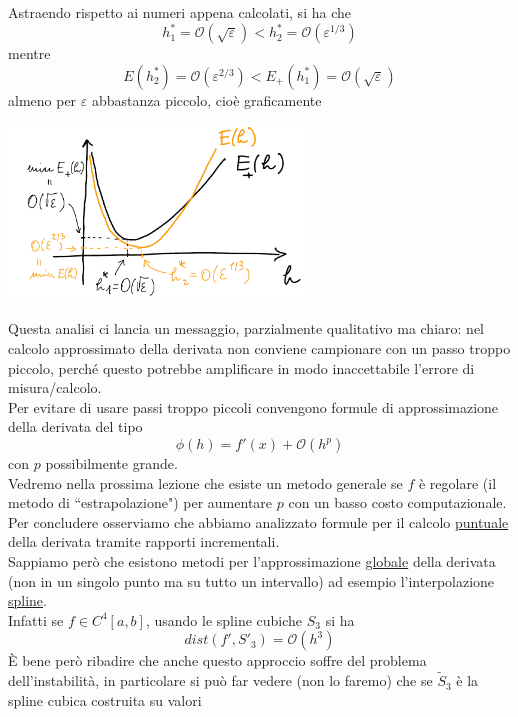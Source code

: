 Astraendo rispetto ai numeri
appena calcolati, si ha che
\[
h_1^* = \mathcal{O}(\sqrt{\varepsilon}) < h_2^* = \mathcal{O}(\varepsilon^{1/3})
\]
mentre
\[
E(h_2^*) = \mathcal{O}(\varepsilon^{2/3}) < E_+(h_1^*) = \mathcal{O}(\sqrt{\varepsilon})
\]
almeno per $\varepsilon$ abbastanza piccolo, cioè graficamente
\begin{center}
    \includegraphics[width=0.6\textwidth]{foto/pag29}
\end{center}
Questa analisi ci lancia un messaggio, parzialmente qualitativo ma chiaro: nel calcolo approssimato
della derivata non conviene campionare con un passo troppo piccolo, perché questo potrebbe amplificare in modo inaccettabile l'errore di misura/calcolo.\\
Per evitare di usare passi troppo piccoli convengono formule di approssimazione della derivata del tipo
\[
\phi(h) = f'(x) + \mathcal{O}(h^p)
\]
con $p$ possibilmente grande.\\
Vedremo nella prossima lezione che esiste un metodo generale se $f$ è regolare (il metodo di
``estrapolazione") per aumentare $p$ con un basso costo computazionale.\\
Per concludere osserviamo che abbiamo analizzato formule per il calcolo \uline{puntuale} della derivata tramite rapporti incrementali.\\
Sappiamo però che esistono metodi per l'approssimazione \uline{globale} della derivata (non in un singolo punto ma su tutto un intervallo) ad esempio l'interpolazione \uline{spline}.\\
Infatti se $f \in C^4 [a,b]$, usando le spline cubiche $S_3$ si ha
\[
dist(f', S'_3) = \mathcal{O}(h^3)
\]
È bene però ribadire che anche questo approccio soffre del problema dell'instabilità, in particolare si può far vedere (non lo faremo) che se $\tilde{S}_3$ è la spline cubica costruita su valori
